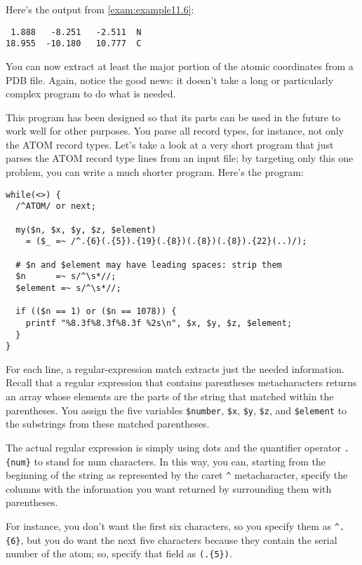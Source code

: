Here's the output from \autoref{exam:example11.6}:

\begin{lstlisting}
 1.888   -8.251   -2.511  N
18.955  -10.180   10.777  C
\end{lstlisting}

You can now extract at least the major portion of the atomic coordinates from a PDB file. Again, notice the good news: it doesn't take a long or particularly complex program to do what is needed.

This program has been designed so that its parts can be used in the future to work well for other purposes. You parse all record types, for instance, not only the ATOM record types. Let's take a look at a very short program that just parses the ATOM record type lines from an input file; by targeting only this one problem, you can write a much shorter program. Here's the program: 

\begin{lstlisting}
while(<>) {
  /^ATOM/ or next;

  my($n, $x, $y, $z, $element)
    = ($_ =~ /^.{6}(.{5}).{19}(.{8})(.{8})(.{8}).{22}(..)/);

  # $n and $element may have leading spaces: strip them
  $n      =~ s/^\s*//;
  $element =~ s/^\s*//;

  if (($n == 1) or ($n == 1078)) {
    printf "%8.3f%8.3f%8.3f %2s\n", $x, $y, $z, $element;
  }
}
\end{lstlisting}

For each line, a regular-expression match extracts just the needed information. Recall that a regular expression that contains parentheses metacharacters returns an array whose elements are the parts of the string that matched within the parentheses. You assign the five variables \verb|$number|, \verb|$x|, \verb|$y|, \verb|$z|, and \verb|$element| to the substrings from these matched parentheses.

The actual regular expression is simply using dots and the quantifier operator \verb|.{num}| to stand for num characters. In this way, you can, starting from the beginning of the string as represented by the caret \verb|^| metacharacter, specify the columns with the information you want returned by surrounding them with parentheses.

For instance, you don't want the first six characters, so you specify them as \verb|^.{6}|, but you do want the next five characters because they contain the serial number of the atom; so, specify that field as \verb|(.{5})|.

